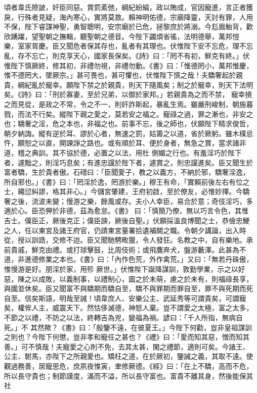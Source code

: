 \begin{pinyinscope}
 頃者韋氏險詖，奸臣同惡。賞罰紊弛，綱紀紛綸，政以賄成，官因寵進，言正者獲戾，行殊者見疑，海內寒心，實將莫救。賴神明佑德，宗廟降靈，天討有罪，人用不保，陛下睿謀神聖，勇智聰明，安宗廟於已危，拯黎庶於將溺。今尨眉鮐背，歡欣踴躍，望聖朝之撫輯，聽聖朝之德音。今陛下蠲煩省徭，法明德舉，萬邦愷
 樂，室家胥慶。臣又聞危者保其存也，亂者有其理也。伏惟陛下安不忘危，理不忘亂，存不忘亡，則克享天心，國家長保矣。《詩》曰：「罔不有初，鮮克有終。」伏惟陛下慎厥終，修其初，非禮勿視，非禮勿動。《書》曰：「惟德罔小，萬邦惟慶，惟不德罔大，墜厥宗。」甚可畏也，甚可懼也，伏惟陛下慎之哉！夫驕奢起於親貴，綱紀亂於寵幸。願陛下禁之於親貴，則天下隨風矣；制之於寵幸，則天下法明矣。《詩》曰：「刑於寡妻，至於兄弟，以御於家邦。」若親貴為之而不禁，
 寵幸撓之而見從，是政之不常，令之不一，則奸詐斯起，暴亂生焉。雖嚴刑峻制，朝施暮戮，而法不行矣。縱陛下親之愛之，莫若安之福之。寵祿之過，罪之漸也，非安之也；驕奢之淫，危之本也，非福之也。前事不忘，後之師也，伏願陛下精求俊哲，朝夕納誨。縱有逆於耳、謬於心者，無速之罰，姑籌之以道，省於厥躬。雖木樸忌忤，願恕之以直，開諫諍之路也。或有順於耳、便於身者，無急之賞，當求諸非道，稽之典訓。其不協於德，必置之以法，用杜
 側媚之行也。有羞淫巧於陛下者，遽黜之，則淫巧息矣；有進忠讜於陛下者，遽賞之，則忠讜進矣。臣又聞生於富者驕，生於貴者傲。石碏曰：「臣聞愛子，教之以義方，不納於邪，驕奢淫逸，所自邪也。」《書》曰：「罔淫於逸，罔游於樂。」穆王有命，「實賴前後左右有位之士，繩愆糾謬，格其非心。」今儲宮肇建，王府初啟，至於僚友，必惟妙擇。今驕奢之後，流波未變；慢游之樂，餘風或存。夫小人幸臣，易合於意；奇伎淫巧，多適於心。臣恐狎於非德，茲為愈怠。《書》
 曰：「慎簡乃僚，無以巧言令色，其惟吉士。僕臣正，厥後克正；僕臣諛，厥後自聖。」伏願採溫良博聞之士，恭儉忠鯁之人，任以東宮及諸王府官，仍請東宮量署拾遺補闕之職。令朝夕講論，出入時從，授以訓誥，交修不迨。臣又聞馳騁畋獵，令人發狂。名教之中，自有樂地。承前貴戚，鮮克由禮。或打球擊鼓，比周伎術；或飛鷹奔犬，盤游藪澤。此甚為不道，非進德修業之本也。《書》曰：「內作色荒，外作禽荒。」又曰：「無若丹硃傲，惟慢游是好。朋淫於家，用殄
 厥世。」伏惟陛下誕降謀訓，敦勤學業，示之以好惡，陳之以成敗，以義制事，以禮制心，圖之於未萌，慮之於未有，則福祿長享，與國並休矣。臣又聞富不與驕期而驕自至，驕不與罪期而罪自至，罪不與死期而死自至。信矣斯語，明哉至誡！頃韋庶人、安樂公主、武延秀等可謂貴矣，可謂寵矣，權侔人主，威震天下。然怙侈滅德，神怒人棄。豈不謂愛之太極，富之太多，不節之以禮，不防之以法，終轉吉為兇，變福為禍。諺曰：「千人所指，無病自死。」不
 其然歟？《書》曰：「殷鑒不遠，在彼夏王。」今陛下何勸，豈非皇祖謀訓之則也？今陛下何懲，豈非孝和寵任之甚也？《禮》曰：「愛而知其惡，憎而知其善。」可不慎哉！夫寵愛之心則不免，去其太甚，閑之禮節，適則可矣。今諸王、公主、駙馬，亦陛下之所親愛也。矯枉之道，在於厥初，鑒誡之義，其取不遠。使觀過務善，居寵思危，庶夙夜惟寅，聿修厥德。《經》曰：「在上不驕，高而不危，所以長守貴也；制節謹度，滿而不溢，所以長守富也。富貴不離其身，然後能保其社

\end{pinyinscope}

